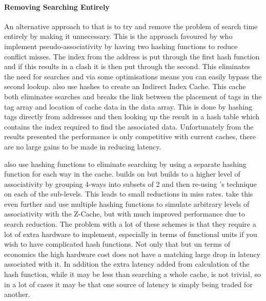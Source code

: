 \paragraph{Removing Searching Entirely}

An alternative approach to that is to try and remove the problem of search time entirely by making it unnecessary. This is the approach favoured by \citet{agarwalColumnassociativeCachesTechnique1993} who implement pseudo-associativity by having two hashing functions to reduce conflict misses. The index from the address is put through the first hash function and if this results in a clash it is then put through the second. This eliminates the need for searches and via some optimisations means you can easily bypass the second lookup. \citet{hallnorFullyAssociativeSoftwaremanaged2000} also use hashes to create an Indirect Index Cache. This cache both eliminates searches and breaks the link between the placement of tags in the tag array and location of cache data in the data array. This is done by hashing tags directly from addresses and then looking up the result in a hash table which contains the index required to find the associated data. Unfortunately from the results presented the performance is only competitive with current caches, there are no large gains to be made in reducing latency. 

\citeauthor{seznecSkewedassociativeCaches1993} \cite{seznecSkewedassociativeCaches1993, seznecCaseTwowaySkewedassociative1993, bodinSkewedAssociativityImproves1997} also use hashing functions to eliminate searching by using a separate hashing function for each way in the cache. \citet{djordjalianMinimallyskewedassociativeCaches2002} builds on \citeauthor{seznecCaseTwowaySkewedassociative1993} but builds to a higher level of associativity by grouping 4-ways into subsets of 2 and then re-using \citeauthor{seznecCaseTwowaySkewedassociative1993}'s technique on each of the sub-levels. This leads to small reductions in miss rates. \citet{sanchezZCacheDecouplingWays2010} take this even further and use multiple hashing functions to simulate arbitrary levels of associativity with the Z-Cache, but with much improved performance due to search reduction. The problem with a lot of these schemes is that they require a lot of extra hardware to implement, especially in terms of functional units if you wish to have complicated hash functions. Not only that but un terms of economics the high hardware cost does not have a matching large drop in latency associated with it. In addition the extra latency added from calculation of the hash function, while it may be less than searching a whole cache, is not trivial, so in a lot of cases it may be that one source of latency is simply being traded for another. 

